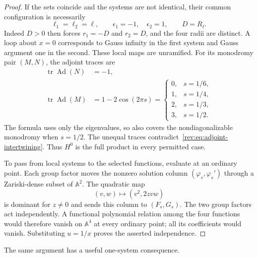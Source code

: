 \begin{proof}
If the sets coincide and the systems are not identical, their common
configuration is necessarily
\[
 \ell_1=\ell_2=\ell,\qquad
 \epsilon_1=-1,\quad\epsilon_2=1,\qquad D=R_\ell.
\]
Indeed $D>0$ then forces $r_1=-D$ and $r_2=D$, and the four radii
are distinct.  A loop about $x=0$ corresponds to Gauss infinity in
the first system and Gauss argument one in the second.  These local
maps are unramified.  For its monodromy pair $(M,N)$, the adjoint
traces are
\begin{equation}\label{rev:eq:collision-traces}
 \begin{split}
 \operatorname{tr}\operatorname{Ad}(N)&=-1,\\
 \operatorname{tr}\operatorname{Ad}(M)
  &=1-2\cos(2\pi s)
    =\begin{cases}
       0,&s=1/6,\\
       1,&s=1/4,\\
       2,&s=1/3,\\
       3,&s=1/2.
      \end{cases}
 \end{split}
\end{equation}
The formula uses only the eigenvalues, so also covers the
nondiagonalizable monodromy when $s=1/2$.  The unequal traces
contradict~\eqref{rev:eq:adjoint-intertwining}.  Thus $H^0$ is the
full product in every permitted case.

To pass from local systems to the selected functions, evaluate at an
ordinary point.  Each group factor moves the nonzero solution column
$(\varphi_s,\varphi_s')$ through a Zariski-dense subset of $\mathbb A^2$.  The
quadratic map
\begin{equation}\label{rev:eq:symmetric-square-projection}
          (v,w)\longmapsto(v^2,2zvw)
\end{equation}
is dominant for $z\ne0$ and sends this column to $(F_s,G_s)$.
The two group factors act independently.  A functional polynomial
relation among the four functions would therefore vanish on
$\mathbb A^4$ at every ordinary point; all its coefficients would
vanish.  Substituting $u=1/x$ proves the asserted independence.
\end{proof}

The same argument has a useful one-system consequence.

